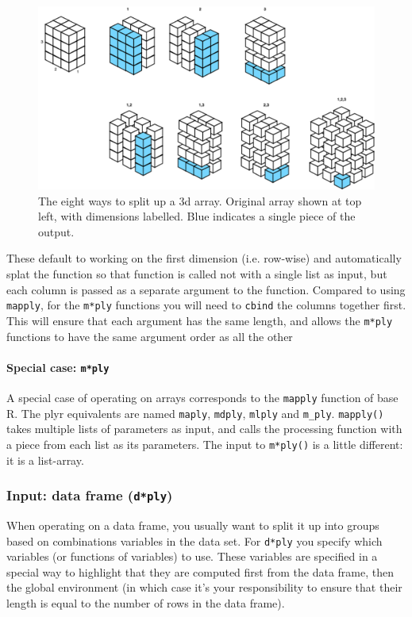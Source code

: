 \documentclass[letterpage]{scrartcl}
\newcommand{\code}[1]{\lstinline!#1!}
\newcommand{\f}[1]{\lstinline!#1()!}
\begin{document}
\begin{figure}[htbp]
  \centering
    \includegraphics[width= \textwidth]{split-array}
  \caption{The eight ways to split up a 3d array.  Original array shown at top left, with dimensions labelled.  Blue indicates a single piece of the output.}
  \label{fig:split-array}
\end{figure}

These default to working on the first dimension (i.e. row-wise) and automatically splat the function so that function is called not with a single list as input, but each column is passed as a separate argument to the function.  Compared to using {\tt mapply}, for the {\tt m*ply} functions you will need to {\tt cbind} the columns together first.  This will ensure that each argument has the same length, and allows the {\tt m*ply} functions to have the same argument order as all the other 

\paragraph{Special case: \code{m*ply}}  A special case of operating on arrays corresponds to the {\tt mapply} function of base R.  The plyr equivalents are named {\tt maply}, {\tt mdply}, {\tt mlply} and {\tt m\_ply}.  \f{mapply} takes multiple lists of parameters as input, and calls the processing function with a piece from each list as its parameters.  The input to \f{m*ply} is a little different: it is a list-array.


\subsubsection{Input: data frame ({\tt d*ply})}

When operating on a data frame, you usually want to split it up into groups based on combinations variables in the data set.  For {\tt d*ply} you specify   which variables (or functions of variables) to use.  These variables are specified in a special way to highlight that they are computed first from the data frame, then the global environment (in which case it's your responsibility to ensure that their length is equal to the number of rows in the data frame).  
\end{document}
